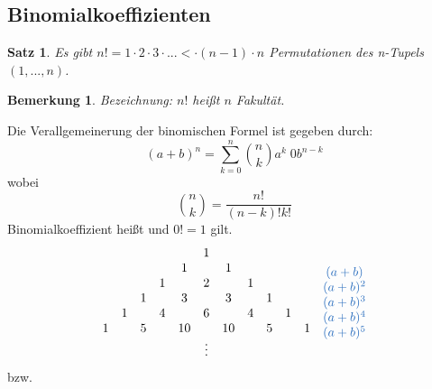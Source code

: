 \documentclass[12pt,a4paper]{article}%
\newtheorem{satz}{Satz}[section]
\newtheorem{bem}{Bemerkung}[section]
\numberwithin{equation}{section}
\def\colBlue#1{\begingroup\color{NavyBlue}{#1}\endgroup}
\numberwithin{equation}{subsection}
\begin{document}
  \subsection{Binomialkoeffizienten}
  \begin{satz}
    Es gibt $n! = 1 \cdot 2 \cdot 3 \cdot ...< \cdot (n-1) \cdot n$ Permutationen des n-Tupels $(1,...,n)$. 
  \end{satz}
  \begin{bem}
    Bezeichnung: $n!$ heißt $n$ Fakultät.
  \end{bem}
  Die Verallgemeinerung der binomischen Formel ist gegeben durch:
  \begin{equation}
    (a+b)^n = \sum_{k=0}^n \binom{n}{k} a^k \;0 b^{n-k}
  \end{equation}
  wobei 
  \begin{equation}
    \binom{n}{k} = \frac{n!}{(n-k)!k!}
  \end{equation}
  Binomialkoeffizient heißt und $0! = 1$ gilt.
  \begin{align}
    \begin{array}{c c c c c c c c c c c c}
      \; & \; &  \; & \; & \; &  1 & \; & \; & \; & \; & \;\\
      \; & \; &  \; & \; & 1  & \; &  1 & \; & \; & \; & \;\\
      \; & \; &  \; & 1  & \; & 2  & \; & 1  & \; & \; & \;\\
      \; & \; &  1  & \; & 3  & \; & 3  & \; & 1  & \; & \;\\
      \; & 1  &  \; & 4  & \; &  6 & \; & 4  & \; & 1  & \;\\
      1  & \; &  5  & \; & 10 & \; & 10 & \; & 5  & \; & 1 \\
      \; & \; &  \; & \; & \; &\vdots& \; & \; & \; & \; & \;\\
    \end{array}
    \begin{array}{c}
      \colBlue{(a+b)} \\
      \colBlue{(a+b)^2} \\
      \colBlue{(a+b)^3} \\
      \colBlue{(a+b)^4} \\
      \colBlue{(a+b)^5} \\
    \end{array}
  \end{align}
  bzw.
\end{document}
